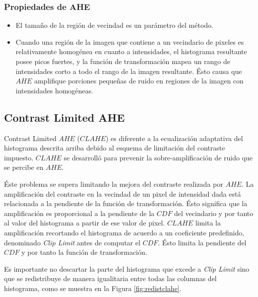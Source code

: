 \subsubsection{Propiedades de AHE}

\begin{itemize}
    \item El tamaño de la región de vecindad es un parámetro del método. 
    \item Cuando una región de la imagen que contiene a un vecindario de pixeles es relativamente homogénea en cuanto a intensidades, el histograma resultante posee picos fuertes, y la función de transformación mapea un rango de intensidades corto a todo el rango de la imagen resultante. Ésto causa que $AHE$ amplifique porciones pequeñas de ruido en regiones de la imagen con intensidades homogéneas.
\end{itemize}

\subsection{Contrast Limited AHE}

Contrast Limited $AHE$ ($CLAHE$) es diferente a la ecualización adaptativa del histograma descrita arriba debido al esquema de limitación del contraste impuesto. $CLAHE$ se desarrolló para prevenir la sobre-amplificación de ruido que se percibe en $AHE$.

Éste problema se supera limitando la mejora del contraste realizada por $AHE$. La amplificación del contraste en la vecindad de un pixel de intensidad dada está relacionada a la pendiente de la función de transformación. Ésto significa que la amplificación es proporcional a la pendiente de la $CDF$ del vecindario y por tanto al valor del histograma a partir de ese valor de pixel. $CLAHE$ limita la amplificación recortando el histograma de acuerdo a un coeficiente predefinido, denominado \textit{Clip Limit} antes de computar el $CDF$. Ésto limita la pendiente del $CDF$ y por tanto la función de transformación.

Es importante no descartar la parte del histograma que excede a \textit{Clip Limit} sino que se redistribuye de manera igualitaria entre todas las columnas del histograma, como se muestra en la Figura \ref{fig:redistclahe}.

